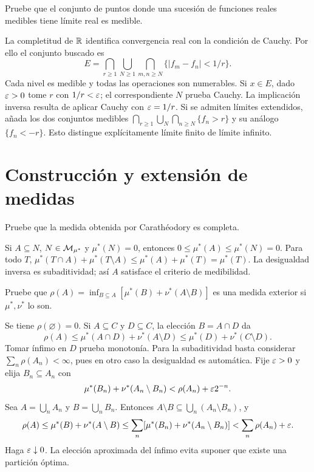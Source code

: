 \begin{ejercicio}\label{ej:v2-l03-6}
Pruebe que el conjunto de puntos donde una sucesión de funciones reales medibles tiene límite real es medible.
\end{ejercicio}
\begin{solucion}
La completitud de $\mathbb R$ identifica convergencia real con la condición de Cauchy. Por ello el conjunto buscado es
\[E=\bigcap_{r\ge1}\bigcup_{N\ge1}\bigcap_{m,n\ge N}
\{|f_m-f_n|<1/r\}.\]
Cada nivel es medible y todas las operaciones son numerables. Si $x\in E$, dado $\varepsilon>0$ tome $r$ con $1/r<\varepsilon$; el correspondiente $N$ prueba Cauchy. La implicación inversa resulta de aplicar Cauchy con $\varepsilon=1/r$. Si se admiten límites extendidos, añada los dos conjuntos medibles $\bigcap_{r\ge1}\bigcup_N\bigcap_{n\ge N}\{f_n>r\}$ y su análogo $\{f_n<-r\}$. Esto distingue explícitamente límite finito de límite infinito.
\end{solucion}

\chapter{Construcción y extensión de medidas}

\begin{ejercicio}\label{ej:v2-l04-1}
Pruebe que la medida obtenida por Carathéodory es completa.
\end{ejercicio}
\begin{solucion}
Si $A\subseteq N$, $N\in\mathcal M_{\mu^*}$ y $\mu^*(N)=0$, entonces $0\le\mu^*(A)\le\mu^*(N)=0$. Para todo $T$, $\mu^*(T\cap A)+\mu^*(T\setminus A)\le\mu^*(A)+\mu^*(T)=\mu^*(T)$. La desigualdad inversa es subaditividad; así $A$ satisface el criterio de medibilidad.
\end{solucion}

\begin{ejercicio}\label{ej:v2-l04-2}
Pruebe que $\rho(A)=\inf_{B\subseteq A}[\mu^*(B)+\nu^*(A\setminus B)]$ es una medida exterior si $\mu^*,\nu^*$ lo son.
\end{ejercicio}
\begin{solucion}
Se tiene $\rho(\varnothing)=0$. Si $A\subseteq C$ y $D\subseteq C$, la elección $B=A\cap D$ da
\[\rho(A)\le\mu^*(A\cap D)+\nu^*(A\setminus D)\le\mu^*(D)+\nu^*(C\setminus D).\]
Tomar ínfimo en $D$ prueba monotonía. Para la subaditividad basta considerar $\sum_n\rho(A_n)<\infty$, pues en otro caso la desigualdad es automática. Fije $\varepsilon>0$ y elija $B_n\subseteq A_n$ con
\[\mu^*(B_n)+\nu^*(A_n\setminus B_n)<\rho(A_n)+\varepsilon2^{-n}.\]
Sea $A=\bigcup_nA_n$ y $B=\bigcup_nB_n$. Entonces $A\setminus B\subseteq\bigcup_n(A_n\setminus B_n)$, y
\[\rho(A)\le\mu^*(B)+\nu^*(A\setminus B)
\le\sum_n[\mu^*(B_n)+\nu^*(A_n\setminus B_n)]<\sum_n\rho(A_n)+\varepsilon.\]
Haga $\varepsilon\downarrow0$. La elección aproximada del ínfimo evita suponer que existe una partición óptima.
\end{solucion}

